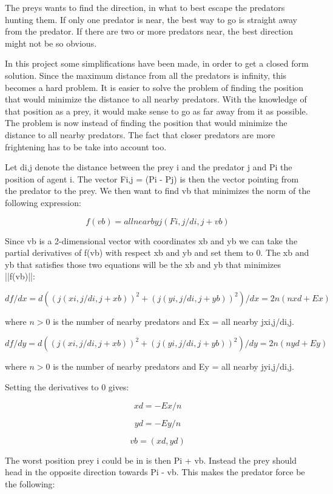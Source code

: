 \documentclass[paper=a4, fontsize=11pt,twoside]{scrartcl}		%
\begin{document}
\begin{flushleft}
The preys wants to find the direction, in what to best escape the predators hunting them. If only one predator is near, the best way to go is straight away from the predator. If there are two or more predators near, the best direction might not be so obvious. \newline

In this project some simplifications have been made, in order to get a closed form solution. Since the maximum distance from all the predators is infinity, this becomes a hard problem. It is easier to solve the problem of finding the position that would minimize the distance to all nearby predators. With the knowledge of that position as a prey, it would make sense to go as far away from it as possible. The problem is now instead of finding the position that would minimize the distance to all nearby predators. The fact that closer predators are more frightening has to be take into account too. \newline

Let di,j denote the distance between the prey i and the predator j and Pi the position of agent i. The vector Fi,j = (Pi - Pj)  is then the vector pointing from the predator to the prey. We then want to find vb that minimizes the norm of the following expression:

$$f(vb) =all nearby j(Fi,j/di,j + vb)$$

Since vb is a 2-dimensional vector with coordinates xb and yb we can take the partial derivatives of f(vb) with respect xb and yb and set them to 0. The xb and yb that satisfies those two equations will be the xb and yb that minimizes ||f(vb)||:

$$df/dx = d((j(xi,j/di,j + xb))^2+(j(yi,j/di,j + yb))^2)/dx = 2n(nxd+Ex)$$ 

where $n > 0$ is the number of nearby predators and Ex = all nearby jxi,j/di,j.

$$df/dy = d((j(xi,j/di,j + xb))^2+(j(yi,j/di,j + yb))^2)/dy = 2n(nyd+Ey)$$ 

where $n > 0$ is the number of nearby predators and Ey = all nearby jyi,j/di,j. \newline

Setting the derivatives to 0 gives:

$$xd = -Ex/n$$

$$yd = -Ey/n$$

$$vb = (xd, yd)$$

The worst position prey i could be in is then Pi + vb. Instead the prey should head in the opposite direction towards Pi - vb. This makes the predator force be the following:


\end{flushleft}
\end{document}
